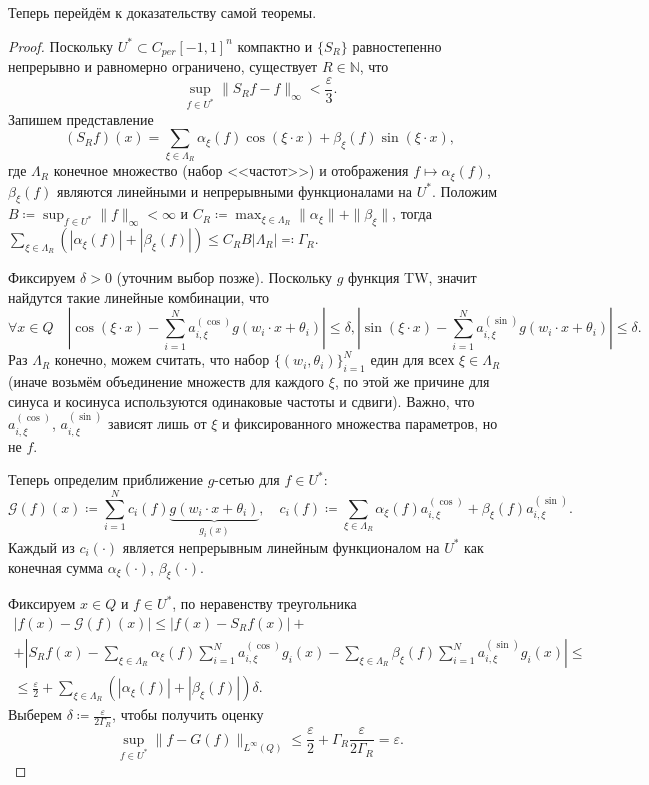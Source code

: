 \documentclass[a4paper, 12pt]{article}
\theoremstyle{definition}
\theoremstyle{plain}
\theoremstyle{remark}
\theoremstyle{remark}
\theoremstyle{remark}
\begin{document}
Теперь перейдём к доказательству самой теоремы.
\begin{proof}
  Поскольку $U^* \subset C_{per}[-1, 1]^n$ компактно и $\{S_R\}$ равностепенно непрерывно и равномерно ограничено, существует $R \in \mathbb{N}$, что
  $$\sup_{f \in U^*} \|S_R f - f\|_\infty < \frac{\varepsilon}{3}.$$
  Запишем представление
  $$(S_R f)(x) = \sum_{\xi \in \Lambda_R} \alpha_\xi(f) \cos(\xi \cdot x) + \beta_\xi(f) \sin(\xi \cdot x),$$
  где $\Lambda_R$ конечное множество (набор <<частот>>) и отображения $f \mapsto \alpha_\xi(f)$, $\beta_\xi(f)$ являются линейными и непрерывными функционалами на $U^*$.
  Положим $B \coloneq \sup_{f \in U^*} \|f\|_\infty < \infty$ и $C_R \coloneq \max_{\xi \in \Lambda_R} \|\alpha_\xi\| + \|\beta_\xi\|$, тогда  
  $\sum_{\xi \in \Lambda_R} \left(|\alpha_\xi(f)| + |\beta_\xi(f)|\right) \le C_R B |\Lambda_R| \eqcolon \Gamma_R$.

  Фиксируем $\delta > 0$ (уточним выбор позже).
  Поскольку $g$ функция TW, значит найдутся такие линейные комбинации, что
  $$\forall x \in Q\quad\left|\cos(\xi \cdot x) - \sum_{i=1}^N a_{i,\xi}^{(\cos)} g(w_i \cdot x + \theta_i)\right| \le \delta, \left|\sin(\xi \cdot x) - \sum_{i=1}^N a_{i,\xi}^{(\sin)} g(w_i \cdot x + \theta_i)\right| \le \delta.$$
  Раз $\Lambda_R$ конечно, можем считать, что набор $\{(w_i, \theta_i)\}_{i=1}^N$ един для всех $\xi \in \Lambda_R$ (иначе возьмём объединение множеств для каждого $\xi$, по этой же причине для синуса и косинуса используются одинаковые частоты и сдвиги).
  Важно, что $a_{i,\xi}^{(\cos)}$, $a_{i,\xi}^{(\sin)}$ зависят лишь от $\xi$ и фиксированного множества параметров, но не $f$.

  Теперь определим приближение $g$-сетью для $f \in U^*$:
  $$\mathcal{G}(f)(x) \coloneq \sum_{i=1}^{N} c_i(f) \underbrace{g(w_i \cdot x + \theta_i)}_{g_i(x)}, \quad c_i(f) \coloneq \sum_{\xi \in \Lambda_R} \alpha_\xi(f) a_{i,\xi}^{(\cos)} + \beta_\xi(f) a_{i,\xi}^{(\sin)}.$$
  Каждый из $c_i(\cdot)$ является непрерывным линейным функционалом на $U^*$ как конечная сумма $\alpha_\xi(\cdot)$, $\beta_\xi(\cdot)$.

  Фиксируем $x \in Q$ и $f \in U^*$, по неравенству треугольника
  \begin{multline*}
    |f(x) - \mathcal{G}(f)(x)| \le |f(x) - S_R f(x)| +\\
    + \left|S_R f(x) - \sum_{\xi \in \Lambda_R} \alpha_\xi(f) \sum_{i = 1}^N a_{i,\xi}^{(\cos)} g_i(x) - \sum_{\xi \in \Lambda_R} \beta_\xi(f) \sum_{i = 1}^N a_{i,\xi}^{(\sin)} g_i(x)\right| \le \\
    \le \frac{\varepsilon}{2} + \sum_{\xi \in \Lambda_R} \left(|\alpha_\xi(f)| + |\beta_\xi(f)|\right) \delta.
  \end{multline*}
  Выберем $\delta \coloneq \frac{\varepsilon}{2\Gamma_R}$, чтобы получить оценку
  $$\sup_{f \in U^*} \|f - G(f)\|_{L^\infty(Q)} \le \frac{\varepsilon}{2} + \Gamma_R\frac{\varepsilon}{2\Gamma_R} = \varepsilon.$$


\end{proof}
\end{document}
